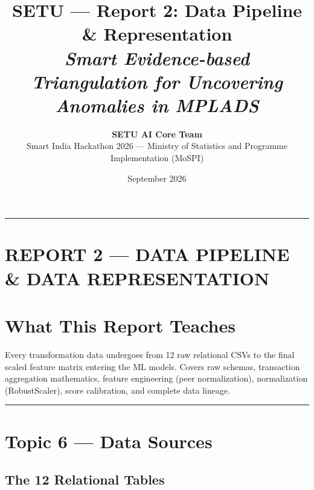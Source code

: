 \documentclass[11pt,a4paper]{article}
\title{\Large\textbf{SETU --- Report 2: Data Pipeline \& Representation}\\[0.4em]\large\textit{Smart Evidence-based Triangulation for Uncovering Anomalies in MPLADS}}
\author{\textbf{SETU AI Core Team}\\Smart India Hackathon 2026 --- Ministry of Statistics and Programme Implementation (MoSPI)}
\date{September 2026}
\begin{document}
\maketitle
\tableofcontents
\vspace{1.5em}
\hrule
\vspace{1.5em}

\clearpage
\section*{REPORT 2 --- DATA PIPELINE \& DATA REPRESENTATION}

\section{What This Report Teaches}

Every transformation data undergoes from 12 raw relational CSVs to the final scaled feature matrix entering the ML models. Covers raw schemas, transaction aggregation mathematics, feature engineering (peer normalization), normalization (RobustScaler), score calibration, and complete data lineage.

\vspace{1em}\hrule\vspace{1em}

\section{Topic 6 --- Data Sources}

\subsection{The 12 Relational Tables}
\end{document}
